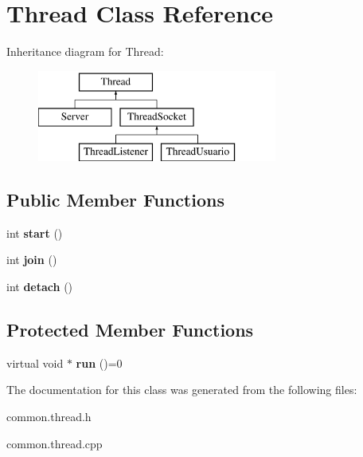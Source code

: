 \hypertarget{classThread}{\section{Thread Class Reference}
\label{classThread}
}
Inheritance diagram for Thread\-:\begin{figure}[H]
\begin{center}
\leavevmode
\includegraphics[height=3.000000cm]{classThread}
\end{center}
\end{figure}
\subsection*{Public Member Functions}
\begin{DoxyCompactItemize}
\item 
\hypertarget{classThread_a7d563f3201d081af8cc24ea552c6a4e4}{int {\bfseries start} ()}\label{classThread_a7d563f3201d081af8cc24ea552c6a4e4}

\item 
\hypertarget{classThread_a7c3b04b32b4327923cc4c9553a403e32}{int {\bfseries join} ()}\label{classThread_a7c3b04b32b4327923cc4c9553a403e32}

\item 
\hypertarget{classThread_a2a08036a4598cfc554114fee9d0e8485}{int {\bfseries detach} ()}\label{classThread_a2a08036a4598cfc554114fee9d0e8485}

\end{DoxyCompactItemize}
\subsection*{Protected Member Functions}
\begin{DoxyCompactItemize}
\item 
\hypertarget{classThread_a0ceaa28981eacf1051845542053d82b6}{virtual void $\ast$ {\bfseries run} ()=0}\label{classThread_a0ceaa28981eacf1051845542053d82b6}

\end{DoxyCompactItemize}


The documentation for this class was generated from the following files\-:\begin{DoxyCompactItemize}
\item 
common.\-thread.\-h\item 
common.\-thread.\-cpp\end{DoxyCompactItemize}
